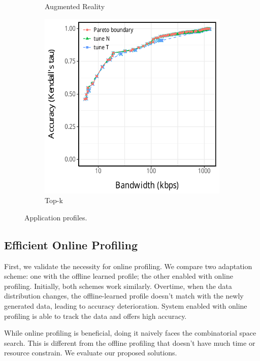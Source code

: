 \begin{figure}
\begin{subfigure}[t]{0.3\textwidth}
    \caption{Augmented Reality}
    \label{fig:ar-profile}
  \end{subfigure}
  \hfill
  \begin{subfigure}[t]{0.3\textwidth}
    \centering
    \includegraphics[width=\textwidth]{figures/topk-profile.pdf}
    \caption{Top-k}
    \label{fig:tk-profile}
  \end{subfigure}
  \caption{Application profiles.}
  \label{fig:all-profiles}
\end{figure}

\subsection{Efficient Online Profiling}
\label{sec:online-profiling}

First, we validate the necessity for online profiling. We compare two adaptation
scheme: one with the offline learned profile; the other enabled with online
profiling. Initially, both schemes work similarly. Overtime, when the data
distribution changes, the offline-learned profile doesn't match with the newly
generated data, leading to accuracy deterioration. System enabled with online
profiling is able to track the data and offers high accuracy.

While online profiling is beneficial, doing it naively faces the combinatorial
space search. This is different from the offline profiling that doesn't have
much time or resource constrain. We evaluate our proposed solutions.

